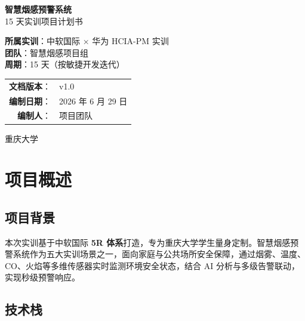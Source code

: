 \documentclass[UTF8,12pt,a4paper]{ctexart}
\begin{document}
\begin{titlepage}
\centering
\vspace*{2cm}
{\Huge\bfseries\color{mainblue} 智慧烟感预警系统}\\[0.6cm]
{\LARGE 15 天实训项目计划书}\\[1.5cm]

\begin{tcolorbox}[colback=lightblue,colframe=mainblue,width=0.8\textwidth,arc=3mm,boxrule=1pt]
\centering\large
\textbf{所属实训}：中软国际 × 华为 HCIA-PM 实训\\[0.3em]
\textbf{团队}：智慧烟感项目组\\[0.3em]
\textbf{周期}：15 天（按敏捷开发迭代）
\end{tcolorbox}

\vspace{2cm}

\begin{tabular}{rl}
\textbf{文档版本}： & v1.0 \\
\textbf{编制日期}： & 2026 年 6 月 29 日 \\
\textbf{编制人}：   & 项目团队 \\
\end{tabular}

\vfill
{\large 重庆大学}
\end{titlepage}

\tableofcontents
\newpage

\section{项目概述}

\subsection{项目背景}

本次实训基于中软国际 \textbf{5R 体系}打造，专为重庆大学学生量身定制。智慧烟感预警系统作为五大实训场景之一，面向家庭与公共场所安全保障，通过烟雾、温度、CO、火焰等多维传感器实时监测环境安全状态，结合 AI 分析与多级告警联动，实现秒级预警响应。

\subsection{技术栈}
\end{document}
